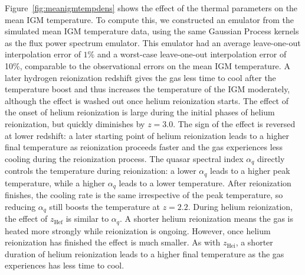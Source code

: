 \documentclass[a4paper,11pt]{article}
\begin{document}
Figure~\ref{fig:meanigmtempdens} shows the effect of the thermal parameters on the mean IGM temperature. To compute this, we constructed an emulator from the simulated mean IGM temperature data, using the same Gaussian Process kernels as the flux power spectrum emulator. This emulator had an average leave-one-out interpolation error of $1\%$ and a worst-case leave-one-out interpolation error of 10\%, comparable to the observational errors on the mean IGM temperature. A later hydrogen reionization redshift gives the gas less time to cool after the temperature boost and thus increases the temperature of the IGM moderately, although the effect is washed out once helium reionization starts. The effect of the onset of helium reionization is large during the initial phases of helium reionization, but quickly diminishes by $z=3.0$. The sign of the effect is reversed at lower redshift: a later starting point of helium reionization leads to a higher final temperature as reionization proceeds faster and the gas experiences less cooling during the reionization process. The quasar spectral index $\alpha_q$ directly controls the temperature during reionization: a lower $\alpha_q$ leads to a higher peak temperature, while a higher $\alpha_q$ leads to a lower temperature. After reionization finishes, the cooling rate is the same irrespective of the peak temperature, so reducing $\alpha_q$ still boosts the temperature at $z=2.2$. During helium reionization, the effect of  $z_\mathrm{Hef}$ is similar to $\alpha_q$. A shorter helium reionization means the gas is heated more strongly while reionization is ongoing. However, once helium reionization has finished the effect is much smaller. As with $z_\mathrm{Hei}$, a shorter duration of helium reionization leads to a higher final temperature as the gas experiences has less time to cool.
\end{document}
